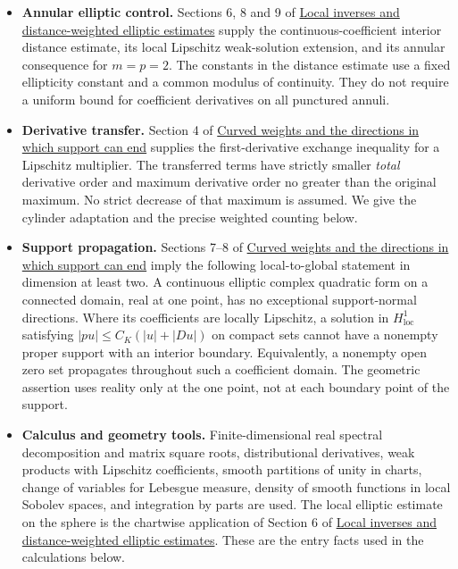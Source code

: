 \documentclass[
  11pt,
]{article}
\providecommand{\tightlist}{%
  \setlength{\itemsep}{0pt}\setlength{\parskip}{0pt}}
\begin{document}
\begin{itemize}
\tightlist
\item
  \textbf{Annular elliptic control.} Sections 6, 8 and 9 of
  \href{local-elliptic-coefficients.pdf}{Local inverses and
  distance-weighted elliptic estimates} supply the
  continuous-coefficient interior distance estimate, its local Lipschitz
  weak-solution extension, and its annular consequence for \(m=p=2\).
  The constants in the distance estimate use a fixed ellipticity
  constant and a common modulus of continuity. They do not require a
  uniform bound for coefficient derivatives on all punctured annuli.
\item
  \textbf{Derivative transfer.} Section 4 of
  \href{support-continuation.pdf}{Curved weights and the directions in
  which support can end} supplies the first-derivative exchange
  inequality for a Lipschitz multiplier. The transferred terms have
  strictly smaller \emph{total} derivative order and maximum derivative
  order no greater than the original maximum. No strict decrease of that
  maximum is assumed. We give the cylinder adaptation and the precise
  weighted counting below.
\item
  \textbf{Support propagation.} Sections 7--8 of
  \href{support-continuation.pdf}{Curved weights and the directions in
  which support can end} imply the following local-to-global statement
  in dimension at least two. A continuous elliptic complex quadratic
  form on a connected domain, real at one point, has no exceptional
  support-normal directions. Where its coefficients are locally
  Lipschitz, a solution in \(H^1_{\mathrm{loc}}\) satisfying
  \(|pu|\leq C_K(|u|+|Du|)\) on compact sets cannot have a nonempty
  proper support with an interior boundary. Equivalently, a nonempty
  open zero set propagates throughout such a coefficient domain. The
  geometric assertion uses reality only at the one point, not at each
  boundary point of the support.
\item
  \textbf{Calculus and geometry tools.} Finite-dimensional real spectral
  decomposition and matrix square roots, distributional derivatives,
  weak products with Lipschitz coefficients, smooth partitions of unity
  in charts, change of variables for Lebesgue measure, density of smooth
  functions in local Sobolev spaces, and integration by parts are used.
  The local elliptic estimate on the sphere is the chartwise application
  of Section 6 of \href{local-elliptic-coefficients.pdf}{Local inverses
  and distance-weighted elliptic estimates}. These are the entry facts
  used in the calculations below.
\end{itemize}
\end{document}
